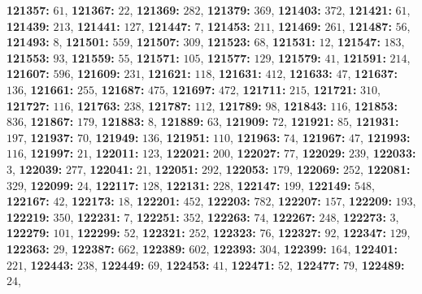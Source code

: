 \textsf{\bfseries 121357:} $61$, \textsf{\bfseries 121367:} $22$, \textsf{\bfseries 121369:} $282$, \textsf{\bfseries 121379:} $369$, \textsf{\bfseries 121403:} $372$, \textsf{\bfseries 121421:} $61$, \textsf{\bfseries 121439:} $213$, \textsf{\bfseries 121441:} $127$, \textsf{\bfseries 121447:} $7$, \textsf{\bfseries 121453:} $211$, \textsf{\bfseries 121469:} $261$, \textsf{\bfseries 121487:} $56$, \textsf{\bfseries 121493:} $8$, \textsf{\bfseries 121501:} $559$, \textsf{\bfseries 121507:} $309$, \textsf{\bfseries 121523:} $68$, \textsf{\bfseries 121531:} $12$, \textsf{\bfseries 121547:} $183$, \textsf{\bfseries 121553:} $93$, \textsf{\bfseries 121559:} $55$, \textsf{\bfseries 121571:} $105$, \textsf{\bfseries 121577:} $129$, \textsf{\bfseries 121579:} $41$, \textsf{\bfseries 121591:} $214$, \textsf{\bfseries 121607:} $596$, \textsf{\bfseries 121609:} $231$, \textsf{\bfseries 121621:} $118$, \textsf{\bfseries 121631:} $412$, \textsf{\bfseries 121633:} $47$, \textsf{\bfseries 121637:} $136$, \textsf{\bfseries 121661:} $255$, \textsf{\bfseries 121687:} $475$, \textsf{\bfseries 121697:} $472$, \textsf{\bfseries 121711:} $215$, \textsf{\bfseries 121721:} $310$, \textsf{\bfseries 121727:} $116$, \textsf{\bfseries 121763:} $238$, \textsf{\bfseries 121787:} $112$, \textsf{\bfseries 121789:} $98$, \textsf{\bfseries 121843:} $116$, \textsf{\bfseries 121853:} $836$, \textsf{\bfseries 121867:} $179$, \textsf{\bfseries 121883:} $8$, \textsf{\bfseries 121889:} $63$, \textsf{\bfseries 121909:} $72$, \textsf{\bfseries 121921:} $85$, \textsf{\bfseries 121931:} $197$, \textsf{\bfseries 121937:} $70$, \textsf{\bfseries 121949:} $136$, \textsf{\bfseries 121951:} $110$, \textsf{\bfseries 121963:} $74$, \textsf{\bfseries 121967:} $47$, \textsf{\bfseries 121993:} $116$, \textsf{\bfseries 121997:} $21$, \textsf{\bfseries 122011:} $123$, \textsf{\bfseries 122021:} $200$, \textsf{\bfseries 122027:} $77$, \textsf{\bfseries 122029:} $239$, \textsf{\bfseries 122033:} $3$, \textsf{\bfseries 122039:} $277$, \textsf{\bfseries 122041:} $21$, \textsf{\bfseries 122051:} $292$, \textsf{\bfseries 122053:} $179$, \textsf{\bfseries 122069:} $252$, \textsf{\bfseries 122081:} $329$, \textsf{\bfseries 122099:} $24$, \textsf{\bfseries 122117:} $128$, \textsf{\bfseries 122131:} $228$, \textsf{\bfseries 122147:} $199$, \textsf{\bfseries 122149:} $548$, \textsf{\bfseries 122167:} $42$, \textsf{\bfseries 122173:} $18$, \textsf{\bfseries 122201:} $452$, \textsf{\bfseries 122203:} $782$, \textsf{\bfseries 122207:} $157$, \textsf{\bfseries 122209:} $193$, \textsf{\bfseries 122219:} $350$, \textsf{\bfseries 122231:} $7$, \textsf{\bfseries 122251:} $352$, \textsf{\bfseries 122263:} $74$, \textsf{\bfseries 122267:} $248$, \textsf{\bfseries 122273:} $3$, \textsf{\bfseries 122279:} $101$, \textsf{\bfseries 122299:} $52$, \textsf{\bfseries 122321:} $252$, \textsf{\bfseries 122323:} $76$, \textsf{\bfseries 122327:} $92$, \textsf{\bfseries 122347:} $129$, \textsf{\bfseries 122363:} $29$, \textsf{\bfseries 122387:} $662$, \textsf{\bfseries 122389:} $602$, \textsf{\bfseries 122393:} $304$, \textsf{\bfseries 122399:} $164$, \textsf{\bfseries 122401:} $221$, \textsf{\bfseries 122443:} $238$, \textsf{\bfseries 122449:} $69$, \textsf{\bfseries 122453:} $41$, \textsf{\bfseries 122471:} $52$, \textsf{\bfseries 122477:} $79$, \textsf{\bfseries 122489:} $24$, 
